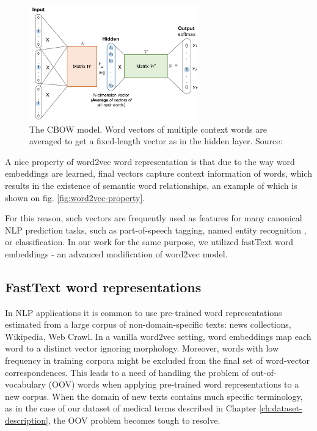 \begin{figure}[h]
    \centering
    \includegraphics[height=5cm]{Images/word2vec-cbow.png}
    \caption{The CBOW model. Word vectors of multiple context words are averaged to get a fixed-length vector as in the hidden layer. Source: \citep{Weng-2017}}
    \label{fig:word2vec-cbow}
\end{figure} 

A nice property of word2vec word representation is that due to the way word embeddings are learned, final vectors capture context information of words, which results in the existence of semantic word relationships, an example of which is shown on fig. \ref{fig:word2vec-property}. 

For this reason, such vectors are frequently used as features for many canonical NLP prediction tasks, such as part-of-speech tagging, named entity recognition \citep{Collobert:DBLP}, or classification. In our work for the same purpose, we utilized fastText word embeddings - an advanced modification of word2vec model.

\subsection{FastText word representations}
\label{sec:fasttext}

In NLP applications it is common to use pre-trained word representations estimated from a large corpus of non-domain-specific texts: news collections, Wikipedia, Web Crawl. In a vanilla word2vec setting, word embeddings map each word to a distinct vector ignoring morphology. Moreover, words with low frequency in training corpora might be excluded from the final set of word-vector correspondences. This leads to a need of handling the problem of out-of-vocabulary (OOV) words when applying pre-trained word representations to a new corpus. When the domain of new texts contains much specific terminology, as in the case of our dataset of medical terms described in Chapter \ref{ch:dataset-description}, the OOV problem becomes tough to resolve.

